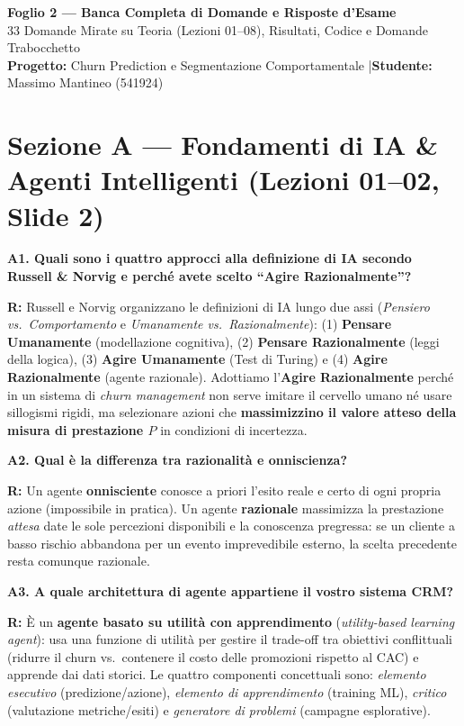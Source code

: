 \documentclass[10pt, a4paper]{article}
\newcommand{\qa}[2]{%
  \par\vspace{4pt}\noindent\textbf{\color{PrimaryNavy}#1}\par\vspace{1pt}%
  \noindent\textbf{\color{SecondaryBlue}R:} #2\par\vspace{2pt}%
}
\begin{document}
\begin{center}
    {\LARGE \bfseries \color{PrimaryNavy} Foglio 2 --- Banca Completa di Domande e Risposte d'Esame}\\[4pt]
    {\large 33 Domande Mirate su Teoria (Lezioni 01--08), Risultati, Codice e Domande Trabocchetto}\\[3pt]
    {\small \textbf{Progetto:} Churn Prediction e Segmentazione Comportamentale \quad|\quad \textbf{Studente:} Massimo Mantineo (541924)}
\end{center}

\section*{Sezione A --- Fondamenti di IA \& Agenti Intelligenti (Lezioni 01--02, Slide 2)}

\qa{A1. Quali sono i quattro approcci alla definizione di IA secondo Russell \& Norvig e perché avete scelto ``Agire Razionalmente''?}{
Russell e Norvig organizzano le definizioni di IA lungo due assi (\textit{Pensiero vs.\ Comportamento} e \textit{Umanamente vs.\ Razionalmente}): (1) \textbf{Pensare Umanamente} (modellazione cognitiva), (2) \textbf{Pensare Razionalmente} (leggi della logica), (3) \textbf{Agire Umanamente} (Test di Turing) e (4) \textbf{Agire Razionalmente} (agente razionale). Adottiamo l'\textbf{Agire Razionalmente} perché in un sistema di \textit{churn management} non serve imitare il cervello umano né usare sillogismi rigidi, ma selezionare azioni che \textbf{massimizzino il valore atteso della misura di prestazione $P$} in condizioni di incertezza.}

\qa{A2. Qual è la differenza tra razionalità e onniscienza?}{
Un agente \textbf{onnisciente} conosce a priori l'esito reale e certo di ogni propria azione (impossibile in pratica). Un agente \textbf{razionale} massimizza la prestazione \textit{attesa} date le sole percezioni disponibili e la conoscenza pregressa: se un cliente a basso rischio abbandona per un evento imprevedibile esterno, la scelta precedente resta comunque razionale.}

\qa{A3. A quale architettura di agente appartiene il vostro sistema CRM?}{
È un \textbf{agente basato su utilità con apprendimento} (\textit{utility-based learning agent}): usa una funzione di utilità per gestire il trade-off tra obiettivi conflittuali (ridurre il churn vs.\ contenere il costo delle promozioni rispetto al CAC) e apprende dai dati storici. Le quattro componenti concettuali sono: \textit{elemento esecutivo} (predizione/azione), \textit{elemento di apprendimento} (training ML), \textit{critico} (valutazione metriche/esiti) e \textit{generatore di problemi} (campagne esplorative).}
\end{document}
